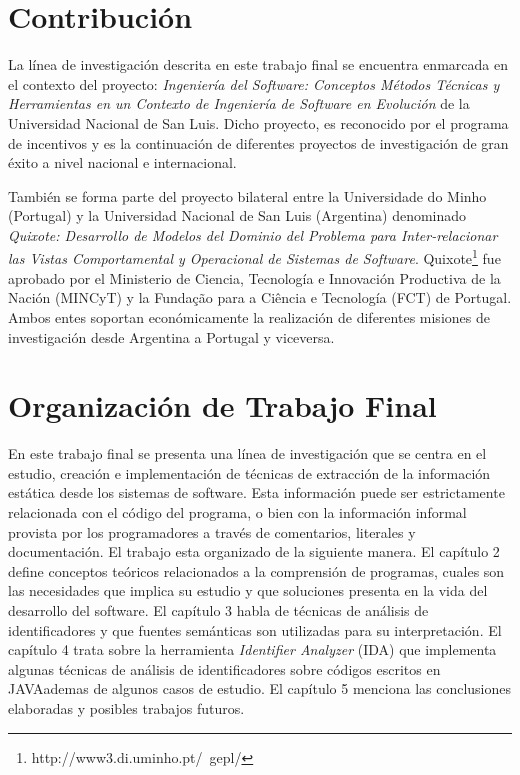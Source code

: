 \documentclass[12pt]{report}
\begin{document}

\pagebreak %
\section{Contribución}
La línea de investigación descrita en este trabajo final se encuentra enmarcada en el 
contexto del proyecto: \textit{Ingeniería del Software: Conceptos Métodos Técnicas y 
Herramientas en un Contexto de Ingeniería de Software en Evolución} de la Universidad 
Nacional de San Luis. 
Dicho proyecto, es reconocido por el programa de incentivos y es la continuación de 
diferentes proyectos de investigación de gran éxito a nivel nacional e internacional.

También se forma parte del proyecto bilateral entre la Universidade do Minho (Portugal)
 y la Universidad Nacional de San Luis (Argentina) denominado \textit{Quixote: Desarrollo de 
Modelos del Dominio del Problema para Inter-relacionar las Vistas Comportamental y 
Operacional de Sistemas de Software}. Quixote\footnote[2]{http://www3.di.uminho.pt/~gepl/} fue aprobado por el 
Ministerio de Ciencia, Tecnología e Innovación Productiva de la Nación 
(MINCyT) y la Fundação para a Ciência e Tecnología (FCT) de Portugal. 
Ambos entes soportan económicamente la realización de diferentes misiones de investigación desde Argentina a Portugal y viceversa.

\section{Organización de Trabajo Final}
En este trabajo final se presenta una línea de investigación que se centra en el estudio, 
creación e implementación de técnicas de extracción de la información estática desde 
los sistemas de software. 
Esta información puede ser estrictamente relacionada con el código del programa, 
o bien con la información informal provista por los programadores a través de 
comentarios, literales y documentación. El trabajo esta organizado de la siguiente manera. El capítulo 2 define conceptos teóricos relacionados a la comprensión de programas, cuales son las necesidades que implica su estudio y que soluciones presenta en la vida del desarrollo del software. El capítulo 3 habla de técnicas de análisis de identificadores y que fuentes semánticas son utilizadas para su interpretación. El capítulo 4 trata sobre la herramienta \textit{Identifier Analyzer} (IDA) que implementa algunas técnicas de análisis de identificadores sobre códigos escritos en JAVA\texttrademark ademas de algunos casos de estudio. El capítulo 5 menciona las conclusiones elaboradas y posibles trabajos futuros.
\end{document}
